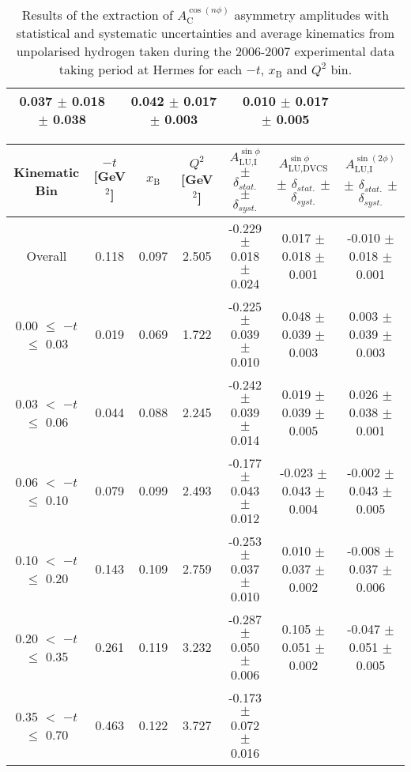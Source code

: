 \begin{table}[width=15cm]
\begin{center}
{\begin{tabular}{|c|c|c|c|c|c|c|c|}
0.037  $\pm$  0.018  $\pm$  0.038 & 0.042 $\pm$   0.017  $\pm$  0.003 & 0.010   $\pm$  0.017   $\pm$   0.005\\
\hline
  \end{tabular}
}
 \end{center}
\caption{Results of the extraction of $A_{\textrm{C}}^{\cos(n\phi)}$ asymmetry amplitudes with statistical and systematic uncertainties and average kinematics from unpolarised hydrogen taken during
the 2006-2007 experimental data taking period at H{\sc ermes} for each $-t$, $x_{\textrm{B}}$ and $Q^{2}$ bin.}
\end{table}


\begin{table}[width=15cm]
 \begin{center}
\resizebox{16cm}{!} {
  \begin{tabular}{|c|c|c|c|c|c|c|}
\hline
Kinematic Bin &  $-t$ [GeV$^{2}$] & $x_{\textrm{B}}$ & $Q^{2}$ [GeV$^{2}$] & 
$A_{\textrm{LU,I}}^{\sin\phi}$ $\pm$ $\delta_{stat.}$ $\pm$ $\delta_{syst.}$ & $A_{\textrm{LU,DVCS}}^{\sin\phi}$ $\pm$ $\delta_{stat.}$ $\pm$ $\delta_{syst.}$
& $A_{\textrm{LU,I}}^{\sin(2\phi)}$ $\pm$ $\delta_{stat.}$ $\pm$ $\delta_{syst.}$ \\
\hline
\hline
Overall &  0.118 & 0.097 &  2.505 &  -0.229  $\pm$  0.018  $\pm$   0.024 &
 0.017  $\pm$  0.018  $\pm$  0.001 & -0.010  $\pm$  0.018  $\pm$   0.001 \\
\hline
0.00 $\leqslant$ $-t$ $\leqslant$ 0.03 &  0.019 & 0.069 &  1.722 &  -0.225  $\pm$  0.039 $\pm$   0.010 &
 0.048  $\pm$  0.039   $\pm$  0.003 & 0.003  $\pm$  0.039  $\pm$   0.003\\
0.03 $<$ $-t$ $\leqslant$ 0.06 &  0.044 & 0.088 &  2.245 &  -0.242 $\pm$   0.039   $\pm$  0.014 &
 0.019 $\pm$   0.039  $\pm$   0.005 & 0.026  $\pm$  0.038  $\pm$   0.001\\
0.06 $<$ $-t$ $\leqslant$ 0.10 &  0.079 & 0.099 &  2.493 & -0.177 $\pm$   0.043   $\pm$  0.012 &
 -0.023  $\pm$  0.043  $\pm$   0.004 & -0.002  $\pm$  0.043   $\pm$  0.005 \\
0.10 $<$ $-t$ $\leqslant$ 0.20 &  0.143 & 0.109 &  2.759 &  -0.253 $\pm$   0.037  $\pm$   0.010 &
0.010  $\pm$  0.037  $\pm$   0.002 & -0.008  $\pm$  0.037  $\pm$  0.006\\
0.20 $<$ $-t$ $\leqslant$ 0.35 &  0.261 & 0.119 &  3.232 &  -0.287 $\pm$   0.050  $\pm$   0.006 &
0.105  $\pm$  0.051  $\pm$   0.002 & -0.047 $\pm$   0.051   $\pm$  0.005\\
0.35 $<$ $-t$ $\leqslant$ 0.70 &  0.463 & 0.122 &  3.727 &  -0.173  $\pm$  0.072  $\pm$   0.016 & 

\end{tabular}}
\end{center}
\end{table}
